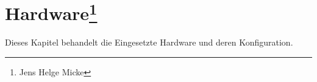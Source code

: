 \chapter[Hardware]{Hardware\footnote{Jens Helge Micke}}
\thispagestyle{fancy}
\label{Hardware}
Dieses Kapitel behandelt die Eingesetzte Hardware und deren Konfiguration.